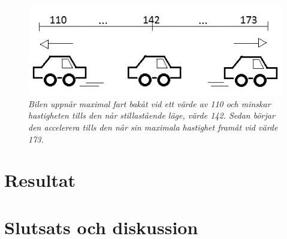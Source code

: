 \documentclass[a4paper]{article}
\begin{document}
\begin{figure}[H]
\includegraphics[scale=1]{110-173Car.jpg}
\centering
\caption{\it Bilen uppnår maximal fart bakåt vid ett värde av 110 och minskar hastigheten tills den når stillastående läge, värde 142. Sedan börjar den accelerera tills den når sin maximala hastighet framåt vid värde 173.}
\end{figure} 









\newpage
\section{Resultat}






\newpage
\section{Slutsats och diskussion}



\newpage


\end{document}
